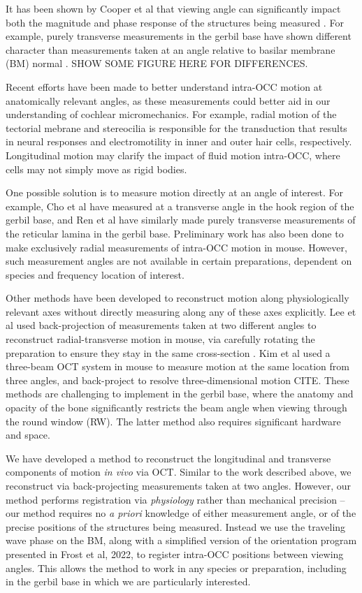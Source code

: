 \documentclass[preprint,NumberedRefs]{JASA}
\begin{document}
\par{It has been shown by Cooper et al that viewing angle can significantly impact both the magnitude and phase response of the structures being measured \citep{cooper2018}. For example, purely transverse measurements in the gerbil base have shown different character than measurements taken at an angle relative to basilar membrane (BM) normal \citep{Puria2022}. SHOW SOME FIGURE HERE FOR DIFFERENCES.}
\par{Recent efforts have been made to better understand intra-OCC motion at anatomically relevant angles, as these measurements could better aid in our understanding of cochlear micromechanics. For example, radial motion of the tectorial mebrane and stereocilia is responsible for the transduction that results in neural responses and electromotility in inner and outer hair cells, respectively. Longitudinal motion may clarify the impact of fluid motion intra-OCC, where cells may not simply move as rigid bodies.} 
\par{One possible solution is to measure motion directly at an angle of interest. For example, Cho et al have measured at a transverse angle in the hook region of the gerbil base, and Ren et al have similarly made purely transverse measurements of the reticular lamina in the gerbil base. Preliminary work has also been done to make exclusively radial measurements of intra-OCC motion in mouse. However, such measurement angles are not available in certain preparations, dependent on species and frequency location of interest.}
\par{Other methods have been developed to reconstruct motion along physiologically relevant axes without directly measuring along any of these axes explicitly. Lee et al used back-projection of measurements taken at two different angles to reconstruct radial-transverse motion in mouse, via carefully rotating the preparation to ensure they stay in the same cross-section \citep{lee}. Kim et al used a three-beam OCT system in mouse to measure motion at the same location from three angles, and back-project to resolve three-dimensional motion CITE. These methods are challenging to implement in the gerbil base, where the anatomy and opacity of the bone significantly restricts the beam angle when viewing through the round window (RW). The latter method also requires significant hardware and space.}
\par{We have developed a method to reconstruct the longitudinal and transverse components of motion \textit{in vivo} via OCT. Similar to the work described above, we reconstruct via back-projecting measurements taken at two angles. However, our method performs registration via \textit{physiology} rather than mechanical precision -- our method requires no \textit{a priori} knowledge of either measurement angle, or of the precise positions of the structures being measured. Instead we use the traveling wave phase on the BM, along with a simplified version of the orientation program presented in Frost et al, 2022, to register intra-OCC positions between viewing angles. This allows the method to work in any species or preparation, including in the gerbil base in which we are particularly interested.}
\end{document}
